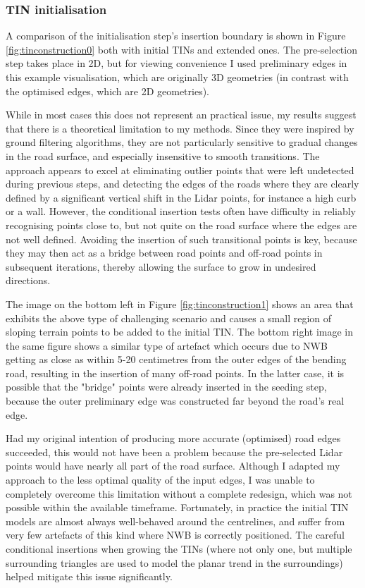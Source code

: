 \subsubsection{TIN initialisation}

A comparison of the initialisation step's insertion boundary is shown in Figure \ref{fig:tinconstruction0} both with initial TINs and extended ones. The pre-selection step takes place in 2D, but for viewing convenience I used preliminary edges in this example visualisation, which are originally 3D geometries (in contrast with the optimised edges, which are 2D geometries).

While in most cases this does not represent an practical issue, my results suggest that there is a theoretical limitation to my methods. Since they were inspired by ground filtering algorithms, they are not particularly sensitive to gradual changes in the road surface, and especially insensitive to smooth transitions. The approach appears to excel at eliminating outlier points that were left undetected during previous steps, and detecting the edges of the roads where they are clearly defined by a significant vertical shift in the Lidar points, for instance a high curb or a wall. However, the conditional insertion tests often have difficulty in reliably recognising points close to, but not quite on the road surface where the edges are not well defined. Avoiding the insertion of such transitional points is key, because they may then act as a bridge between road points and off-road points in subsequent iterations, thereby allowing the surface to grow in undesired directions.

The image on the bottom left in Figure \ref{fig:tinconstruction1} shows an area that exhibits the above type of challenging scenario and causes a small region of sloping terrain points to be added to the initial TIN. The bottom right image in the same figure shows a similar type of artefact which occurs due to NWB getting as close as within 5-20 centimetres from the outer edges of the bending road, resulting in the insertion of many off-road points. In the latter case, it is possible that the "bridge" points were already inserted in the seeding step, because the outer preliminary edge was constructed far beyond the road's real edge.

Had my original intention of producing more accurate (optimised) road edges succeeded, this would not have been a problem because the pre-selected Lidar points would have nearly all part of the road surface. Although I adapted my approach to the less optimal quality of the input edges, I was unable to completely overcome this limitation without a complete redesign, which was not possible within the available timeframe. Fortunately, in practice the initial TIN models are almost always well-behaved around the centrelines, and suffer from very few artefacts of this kind where NWB is correctly positioned. The careful conditional insertions when growing the TINs (where not only one, but multiple surrounding triangles are used to model the planar trend in the surroundings) helped mitigate this issue significantly.

